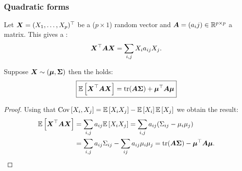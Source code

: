 \subsubsection{Quadratic forms}
Let $\X=(X_1,\dots,X_p)^\top$ be a ($p\times 1$) random vector and $\mA=(a_ij)\in\R^{p\times p}$ a matrix. This gives a :
$$
    \X^\top\mA\X = \sum_{i,j} X_ia_{ij}X_j.
$$ 
\begin{theorem} Suppose $\X\sim (\M, \SS)$ then the  holds:
    \begin{equation}
        \boxed{\ev{\X^\top\mA\X} = \mr{tr}(\bs{A\Sigma}) + \M^\top\mA\M
       } 
    \end{equation}
\end{theorem} 
\begin{proof}
    Using that $\cov{X_i,X_j} = \ev{X_iX_j}-\ev{X_i}\ev{X_j}$ we obtain the result:
    \begin{align*}
        \ev{\X^\top\mA\X}
        &= \sum_{i,j}a_{ij}\ev{X_iX_j}
        = \sum_{i,j}a_{ij}(\Sigma_{ij}-\mu_i\mu_j)
        \\&= \sum_{i,j}a_{ij}\Sigma_{ij} -  \sum_{ij}a_{ij}\mu_i\mu_j
        = \mr{tr}(\mA\SS) - \M^\top\mA\M.
    \end{align*}
\end{proof}


